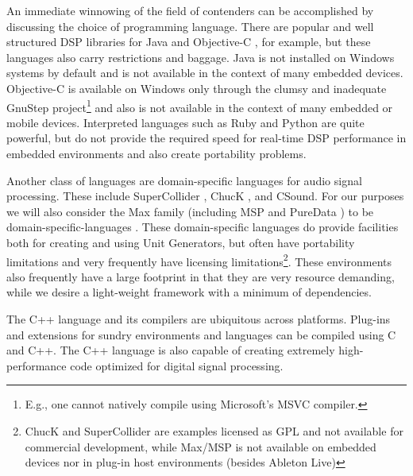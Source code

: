 \documentclass[twoside,10pt]{article}
\begin{document}
An immediate winnowing of the field of contenders can be accomplished by discussing the choice of programming language.  There are popular and well structured DSP libraries for Java \cite{Guillemard:2005, Burk:1998} and Objective-C \cite{Jaffe:1989,Jaffe:1991}, for example, but these languages also carry restrictions and baggage.  Java is not installed on Windows systems by default and is not available in the context of many embedded devices.  Objective-C is available on Windows only through the clumsy and inadequate GnuStep project\footnote{E.g., one cannot natively compile using Microsoft's MSVC compiler.} \cite{web3} and also is not available in the context of many embedded or mobile devices.  Interpreted languages such as Ruby and Python are quite powerful, but do not provide the required speed for real-time DSP performance in embedded environments and also create portability problems. 


Another class of languages are domain-specific languages for audio signal processing.  These include SuperCollider \cite{McCartney:1996}, ChucK \cite{wang:2008}, and CSound.  For our purposes we will also consider the Max family (including MSP \cite{Zicarelli:1998} and PureData \cite{Puckette:1996}) to be domain-specific-languages
.  
These domain-specific languages do provide facilities both for creating and using Unit Generators, but often have portability limitations and very frequently have licensing limitations\footnote{ChucK and SuperCollider are examples licensed as GPL and not available for commercial development, while Max/MSP is not available on embedded devices nor in plug-in host environments (besides Ableton Live)}.  These environments also frequently have a large footprint in that they are very resource demanding, while we desire a light-weight framework with a minimum of dependencies.

The C++ language and its compilers are ubiquitous across platforms.  Plug-ins and extensions for sundry environments and languages can be compiled using C and C++.  The C++ language is also capable of creating extremely high-performance code optimized for digital signal processing.

\end{document}
